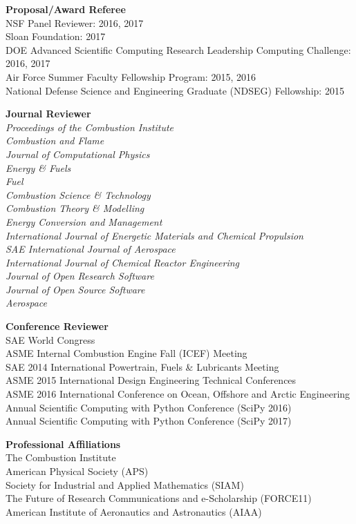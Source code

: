 \documentclass[margin,line,11pt]{res}
\begin{document}
\begin{resume}
\textbf{Proposal\slash Award Referee} \\
NSF Panel Reviewer: 2016, 2017 \\
Sloan Foundation: 2017 \\
DOE Advanced Scientific Computing Research Leadership Computing Challenge: 2016, 2017 \\
Air Force Summer Faculty Fellowship Program: 2015, 2016 \\
National Defense Science and Engineering Graduate (NDSEG) Fellowship: 2015

\textbf{Journal Reviewer} \\
\emph{Proceedings of the Combustion Institute}\\
\emph{Combustion and Flame}\\
\emph{Journal of Computational Physics}\\
\emph{Energy \& Fuels}\\
\emph{Fuel}\\
\emph{Combustion Science \& Technology}\\
\emph{Combustion Theory \& Modelling}\\
\emph{Energy Conversion and Management}\\
\emph{International Journal of Energetic Materials and Chemical Propulsion}\\
\emph{SAE International Journal of Aerospace}\\
\emph{International Journal of Chemical Reactor Engineering} \\
\emph{Journal of Open Research Software} \\
\emph{Journal of Open Source Software} \\
\emph{Aerospace}

\textbf{Conference Reviewer} \\
SAE World Congress\\
ASME Internal Combustion Engine Fall (ICEF) Meeting\\
SAE 2014 International Powertrain, Fuels \& Lubricants Meeting \\
ASME 2015 International Design Engineering Technical Conferences \\
ASME 2016  International Conference on Ocean, Offshore and Arctic Engineering \\
 Annual Scientific Computing with Python Conference (SciPy 2016) \\
 Annual Scientific Computing with Python Conference (SciPy 2017)

\textbf{Professional Affiliations} \\
The Combustion Institute \\
American Physical Society (APS) \\
Society for Industrial and Applied Mathematics (SIAM) \\
The Future of Research Communications and e-Scholarship (FORCE11) \\
American Institute of Aeronautics and Astronautics (AIAA)


\end{resume}
\end{document}
